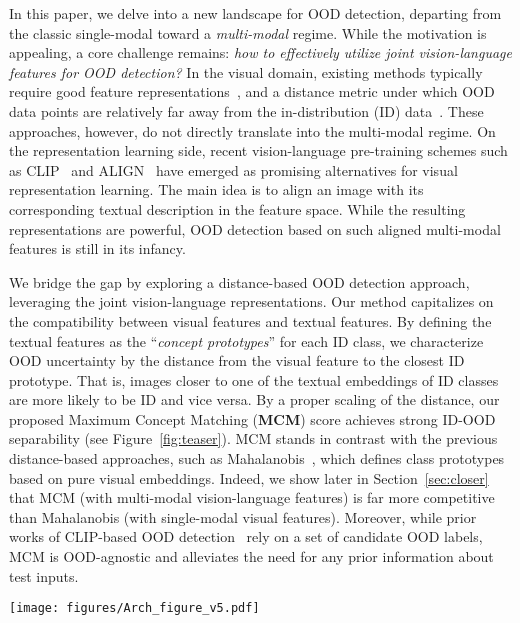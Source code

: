 \documentclass{article}
\begin{document}
In this paper, we delve into a new landscape for OOD detection, departing from the classic {single-modal} toward a \emph{multi-modal} regime. While the motivation is appealing, a core challenge remains: \textit{how to effectively utilize joint vision-language features for OOD detection?} In the visual domain, existing methods typically require good feature representations~\cite{2021ssd,tack2020csi}, and a distance metric under which OOD data points are relatively far away from the in-distribution (ID) data~\cite{lee2018simple,sun2022knn}. These approaches, however, do not directly translate into the multi-modal regime. On the representation learning side, recent vision-language pre-training schemes such as CLIP~\cite{radford2021learning} and ALIGN~\cite{jia2021scaling} have emerged as promising alternatives for visual representation learning. The main idea is to align an image with its corresponding textual description in the feature space. While the resulting representations are powerful, OOD detection based on such aligned multi-modal features is still in its infancy. 


We bridge the gap by exploring a distance-based OOD detection approach, leveraging the joint vision-language representations. Our method capitalizes on the compatibility between visual features and textual features. By defining the textual features as the ``\emph{concept prototypes}'' for each ID class, we characterize OOD uncertainty by the distance from the visual feature to the closest ID prototype. That is, images closer to one of the textual embeddings of ID classes are more likely to be ID and vice versa. By a proper scaling of the distance, our proposed Maximum Concept Matching (\textbf{MCM}) score achieves strong ID-OOD separability (see Figure~\ref{fig:teaser}).
MCM
stands in contrast with the previous distance-based approaches, such as Mahalanobis~\cite{lee2018simple}, which defines class prototypes based on pure visual embeddings. Indeed, we show later in Section~\ref{sec:closer} that MCM (with multi-modal vision-language features) is far more competitive than Mahalanobis (with single-modal visual features). Moreover, while prior works of CLIP-based OOD detection~\cite{esmaeilpour2022zero,fort2021exploring} rely on a set of candidate OOD labels, MCM is OOD-agnostic and alleviates the need for any prior information about test inputs.

\begin{figure*}[t]
  \centering
    \texttt{[image: figures/Arch\_figure\_v5.pdf]}
    
\caption{
Overview of the proposed zero-shot OOD detection framework.
The ID classification task is defined by a set of class labels . The goal of OOD detection is to detect samples that do not belong to . We view the textual embeddings of ID classes (wrapped by text templates) as concept prototypes. The OOD uncertainty of an input image can be characterized by the distance from visual features to the closest ID prototype. By properly scaling the distance, the MCM score achieves strong ID-OOD separability. See Section~\ref{sec:method} for details.}
\vspace{-3mm}
\label{fig:teaser}
\end{figure*}
\end{document}
